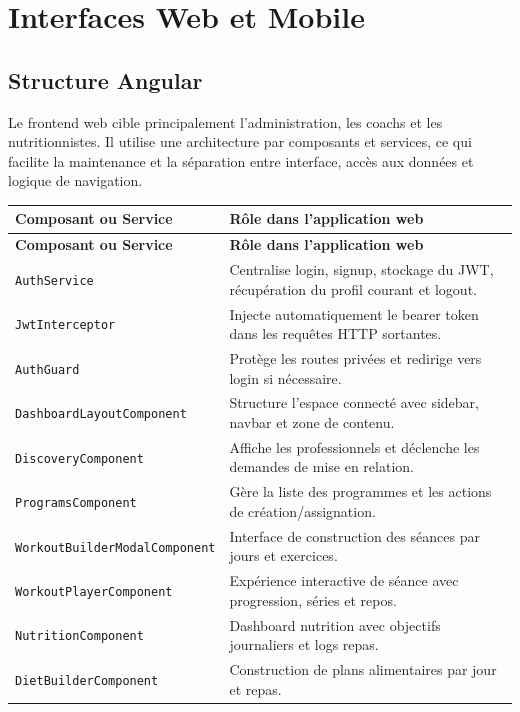 \chapter{Interfaces Web et Mobile}
\minitoc
\newpage

\section{Structure Angular}
Le frontend web cible principalement l'administration, les coachs et les nutritionnistes. Il utilise une architecture par composants et services, ce qui facilite la maintenance et la séparation entre interface, accès aux données et logique de navigation.

\begin{longtable}{|p{4cm}|p{11cm}|}
\hline
\rowcolor[HTML]{D5E8D4}
\textbf{Composant ou Service} & \textbf{Rôle dans l'application web} \\ \hline
\endfirsthead
\hline
\rowcolor[HTML]{D5E8D4}
\textbf{Composant ou Service} & \textbf{Rôle dans l'application web} \\ \hline
\endhead
\texttt{AuthService} & Centralise login, signup, stockage du JWT, récupération du profil courant et logout. \\ \hline
\texttt{JwtInterceptor} & Injecte automatiquement le bearer token dans les requêtes HTTP sortantes. \\ \hline
\texttt{AuthGuard} & Protège les routes privées et redirige vers login si nécessaire. \\ \hline
\texttt{DashboardLayoutComponent} & Structure l’espace connecté avec sidebar, navbar et zone de contenu. \\ \hline
\texttt{DiscoveryComponent} & Affiche les professionnels et déclenche les demandes de mise en relation. \\ \hline
\texttt{ProgramsComponent} & Gère la liste des programmes et les actions de création/assignation. \\ \hline
\texttt{WorkoutBuilderModalComponent} & Interface de construction des séances par jours et exercices. \\ \hline
\texttt{WorkoutPlayerComponent} & Expérience interactive de séance avec progression, séries et repos. \\ \hline
\texttt{NutritionComponent} & Dashboard nutrition avec objectifs journaliers et logs repas. \\ \hline
\texttt{DietBuilderComponent} & Construction de plans alimentaires par jour et repas. \\ \hline

\end{longtable}
